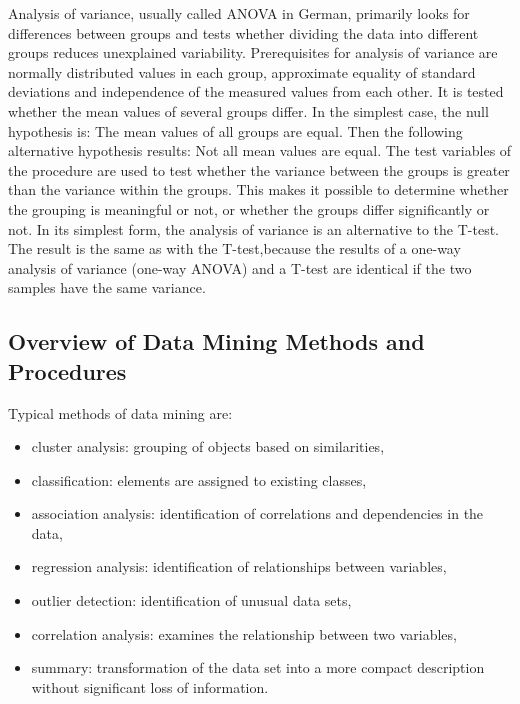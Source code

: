 \glqq Analysis of variance, usually called ANOVA in German, primarily looks for differences between groups and tests whether dividing the data into different groups reduces unexplained variability.\grqq \cite{Dormann:2013} Prerequisites for analysis of variance are normally distributed values in each group, approximate equality of standard deviations and independence of the measured values from each other. It is tested whether the mean values of several groups differ. In the simplest case, the null hypothesis is: The mean values of all groups are equal. Then the following alternative hypothesis results: Not all mean values are equal. The test variables of the procedure are used to test whether the variance between the groups is greater than the variance within the groups. This makes it possible to determine whether the grouping is meaningful or not, or whether the groups differ significantly or not. In its simplest form, the analysis of variance is an alternative to the T-test. The result is the same as with the T-test,\glqq because the results of a one-way analysis of variance (one-way ANOVA) and a T-test are identical if the two samples have the same variance.\grqq \cite{Dormann:2013}

\subsection{Overview of Data Mining Methods and Procedures}


Typical methods of data mining are:

\begin{itemize}
    \item cluster analysis: grouping of objects based on similarities,
    \item classification: elements are assigned to existing classes,
    \item association analysis: identification of correlations and dependencies in the data,
    \item regression analysis: identification of relationships between variables,
    \item outlier detection: identification of unusual data sets,
    \item correlation analysis: examines the relationship between two variables,
    \item summary: transformation of the data set into a more compact description without significant loss of information.
\end{itemize}

